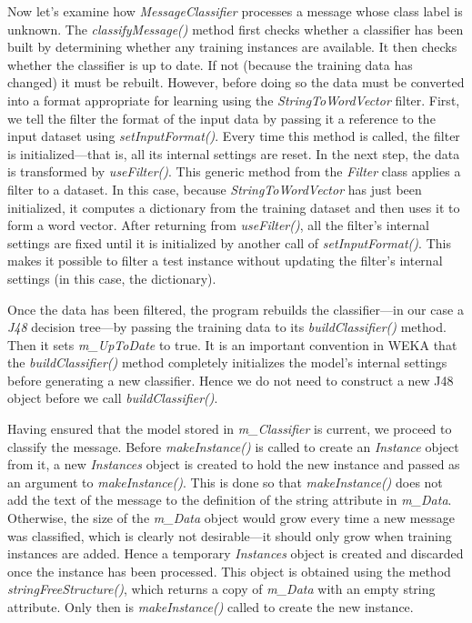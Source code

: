 Now let's examine how \textit{MessageClassifier} processes a message
whose class label is unknown. The \textit{classifyMessage()} method
first checks whether a classifier has been built by determining
whether any training instances are available. It then checks whether
the classifier is up to date. If not (because the training data has
changed) it must be rebuilt. However, before doing so the data must be
converted into a format appropriate for learning using the
\textit{StringToWordVector} filter. First, we tell the filter the
format of the input data by passing it a reference to the input
dataset using \textit{setInputFormat()}. Every time this method is
called, the filter is initialized---that is, all its internal settings
are reset. In the next step, the data is transformed by
\textit{useFilter()}. This generic method from the \textit{Filter}
class applies a filter to a dataset. In this case, because
\textit{StringToWordVector} has just been initialized, it computes a
dictionary from the training dataset and then uses it to form a word
vector. After returning from \textit{useFilter()}, all the filter's
internal settings are fixed until it is initialized by another call of
\textit{setInputFormat()}. This makes it possible to filter a test
instance without updating the filter's internal settings (in this
case, the dictionary).

Once the data has been filtered, the program rebuilds the
classifier---in our case a \textit{J48} decision tree---by passing the
training data to its \textit{buildClassifier()} method. Then it sets
\textit{m\_UpToDate} to true. It is an important convention in WEKA
that the \textit{buildClassifier()} method completely initializes the
model's internal settings before generating a new classifier. Hence we
do not need to construct a new J48 object before we call
\textit{buildClassifier()}.

Having ensured that the model stored in \textit{m\_Classifier} is
current, we proceed to classify the message. Before
\textit{makeInstance()} is called to create an \textit{Instance}
object from it, a new \textit{Instances} object is created to hold the
new instance and passed as an argument to
\textit{makeInstance()}. This is done so that \textit{makeInstance()}
does not add the text of the message to the definition of the string
attribute in \textit{m\_Data}. Otherwise, the size of the
\textit{m\_Data} object would grow every time a new message was
classified, which is clearly not desirable---it should only grow when
training instances are added. Hence a temporary \textit{Instances}
object is created and discarded once the instance has been
processed. This object is obtained using the method
\textit{stringFreeStructure()}, which returns a copy of
\textit{m\_Data} with an empty string attribute. Only then is
\textit{makeInstance()} called to create the new instance.

